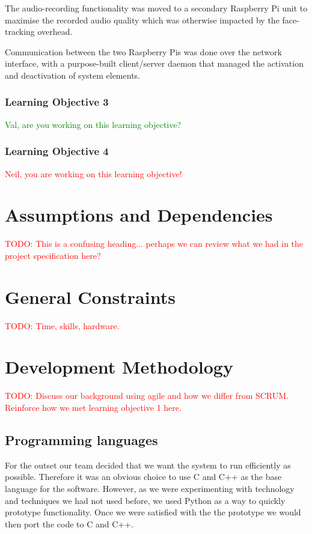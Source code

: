 \documentclass[11pt,a4paper,titlepage]{report}
\begin{document}
The audio-recording functionality was moved to a secondary Raspberry Pi unit to maximise the recorded audio quality which was otherwise impacted by the face-tracking overhead.

Communication between the two Raspberry Pis was done over the network interface, with a purpose-built client/server daemon that managed the activation and deactivation of system elements.

\subsubsection{Learning Objective 3}

\textcolor{green}{Val, are you working on this learning objective?}

\subsubsection{Learning Objective 4}

\textcolor{red}{Neil, you are working on this learning objective!}



\section{Assumptions and Dependencies}

\textcolor{red}{TODO: This is a confusing heading... perhaps we can review what we had in the project specification here?}


\section{General Constraints}

\textcolor{red}{TODO: Time, skills, hardware.}


\section{Development Methodology}

\textcolor{red}{TODO: Discuss our background using agile and how we differ from SCRUM. Reinforce how we met learning objective 1 here.}


\subsection{Programming languages}

For the outset our team decided that we want the system to run efficiently as possible. Therefore it was an obvious choice to use C and C++ as the base language for the software. However, as we were experimenting with technology and techniques we had not used before, we used Python as a way to quickly prototype functionality. Once we were satisfied with the the prototype we would then port the code to C and C++.
\end{document}
